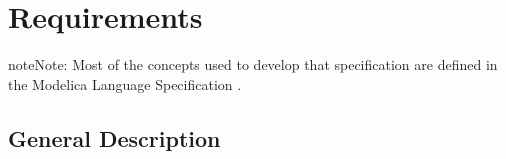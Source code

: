 \documentclass[letterpaper,10pt, openany,english]{sphinxmanual}
\begin{document}
\begin{figure}[htbp]
\centering

\noindent{}
\end{figure}

\begin{figure}[htbp]
\centering

\noindent{}
\end{figure}

\begin{figure}[htbp]
\centering

\noindent{}
\end{figure}


\chapter{Requirements}
\label{\detokenize{requirements:requirements}}\label{\detokenize{requirements:sec-requirements}}\label{\detokenize{requirements::doc}}
\begin{sphinxadmonition}{note}{Note:}
Most of the concepts used to develop that specification are defined in the Modelica Language Specification .
\end{sphinxadmonition}


\section{General Description}
\label{\detokenize{requirements:general-description}}\label{\detokenize{requirements:sec-general-description}}
\end{document}
